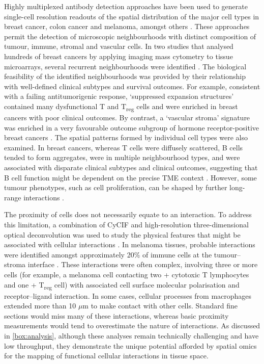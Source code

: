Highly multiplexed antibody detection approaches have been used to generate single-cell resolution readouts of the spatial distribution of the major cell types in breast cancer, colon cancer and melanoma, amongst others \parencite{Danenberg2022-zb,Jackson2020-em,Nirmal2022-sq,Schurch2020-lp}. These approaches permit the detection of microscopic neighbourhoods with distinct composition of tumour, immune, stromal and vascular cells. In two studies that analysed hundreds of breast cancers by applying imaging mass cytometry  to tissue microarrays, several recurrent neighbourhoods were identified \parencite{Danenberg2022-zb,Jackson2020-em} . The biological feasibility of the identified neighbourhoods was provided by their relationship with well-defined clinical subtypes and survival outcomes. For example, consistent with a failing antitumorigenic response, ‘suppressed expansion structures’ contained many dysfunctional T and T\textsubscript{reg} cells and were enriched in breast cancers with poor clinical outcomes. By contrast, a ‘vascular stroma’ signature was enriched in a very favourable outcome subgroup of hormone receptor-positive breast cancers  . The spatial patterns formed by individual cell types were also examined. In breast cancers, whereas T cells were diffusely scattered, B cells tended to form aggregates, were in multiple neighbourhood types, and were associated with disparate clinical subtypes and clinical outcomes, suggesting that B cell function might be dependent on the precise TME context \parencite{Wieland2021-ep} . However, some tumour phenotypes, such as cell proliferation, can be shaped by further long-range interactions \parencite{Gaglia2022-zn}.

The proximity of cells does not necessarily equate to an interaction. To address this limitation, a combination of CyCIF  and high-resolution three-dimensional optical deconvolution was used to study the physical features that might be associated with cellular interactions \parencite{Nirmal2022-sq}. In melanoma tissues, probable interactions were identified amongst approximately 20\% of immune cells at the tumour–stroma interface . These interactions were often complex, involving three or more cells (for example, a melanoma cell contacting two + cytotoxic T lymphocytes and one + T\textsubscript{reg} cell) with associated cell surface molecular polarisation and receptor–ligand interaction. In some cases, cellular processes from macrophages extended more than 10 $\mu$m to make contact with other cells. Standard fine sections would miss many of these interactions, whereas basic proximity measurements would tend to overestimate the nature of interactions. As discussed in \cref{box:analysis}, although these analyses remain technically challenging and have low throughput, they demonstrate the unique potential afforded by spatial omics for the mapping of functional cellular interactions in tissue space.

